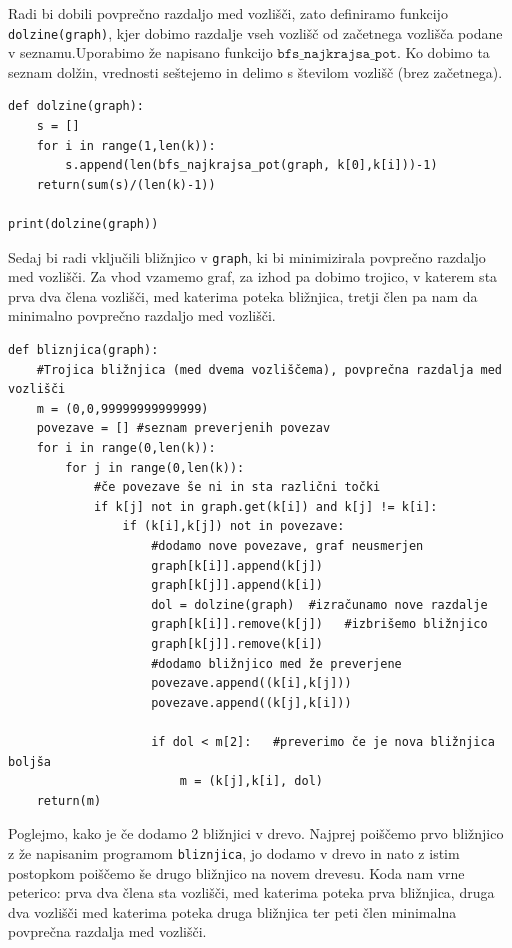 \documentclass[a4paper,10pt]{article}
\begin{document}
Radi bi dobili povprečno razdaljo med vozlišči, zato definiramo funkcijo \texttt{dolzine(graph)}, kjer dobimo razdalje vseh vozlišč od začetnega vozlišča  podane v seznamu.Uporabimo že napisano funkcijo  $\texttt{bfs\_najkrajsa\_pot}$.  Ko dobimo ta seznam dolžin, vrednosti seštejemo in delimo s številom vozlišč (brez začetnega).

\begin{verbatim}
def dolzine(graph):
    s = []
    for i in range(1,len(k)):
        s.append(len(bfs_najkrajsa_pot(graph, k[0],k[i]))-1)
    return(sum(s)/(len(k)-1))
    
print(dolzine(graph))
\end{verbatim}

Sedaj bi radi vključili bližnjico v \texttt{graph}, ki bi minimizirala povprečno razdaljo med vozlišči. Za vhod vzamemo graf, za izhod pa dobimo trojico, v katerem sta prva dva člena vozlišči, med katerima poteka bližnjica, tretji člen pa nam da minimalno povprečno razdaljo med vozlišči.

\begin{verbatim}
def bliznjica(graph):
    #Trojica bližnjica (med dvema vozliščema), povprečna razdalja med vozlišči
    m = (0,0,99999999999999)
    povezave = [] #seznam preverjenih povezav
    for i in range(0,len(k)):
        for j in range(0,len(k)):
            #če povezave še ni in sta različni točki
            if k[j] not in graph.get(k[i]) and k[j] != k[i]:
                if (k[i],k[j]) not in povezave:
                    #dodamo nove povezave, graf neusmerjen
                    graph[k[i]].append(k[j])
                    graph[k[j]].append(k[i])
                    dol = dolzine(graph)  #izračunamo nove razdalje
                    graph[k[i]].remove(k[j])   #izbrišemo bližnjico
                    graph[k[j]].remove(k[i])
                    #dodamo bližnjico med že preverjene
                    povezave.append((k[i],k[j]))
                    povezave.append((k[j],k[i]))

                    if dol < m[2]:   #preverimo če je nova bližnjica boljša
                        m = (k[j],k[i], dol)
    return(m)
\end{verbatim}

Poglejmo, kako je če dodamo 2 bližnjici v drevo. Najprej poiščemo prvo bližnjico z že napisanim programom \texttt{bliznjica}, jo dodamo v drevo in nato z istim postopkom poiščemo še drugo bližnjico na novem drevesu. Koda nam vrne peterico: prva dva člena sta vozlišči, med katerima poteka prva bližnjica, druga dva vozlišči med katerima poteka druga bližnjica ter peti člen minimalna povprečna razdalja med vozlišči.
\end{document}
